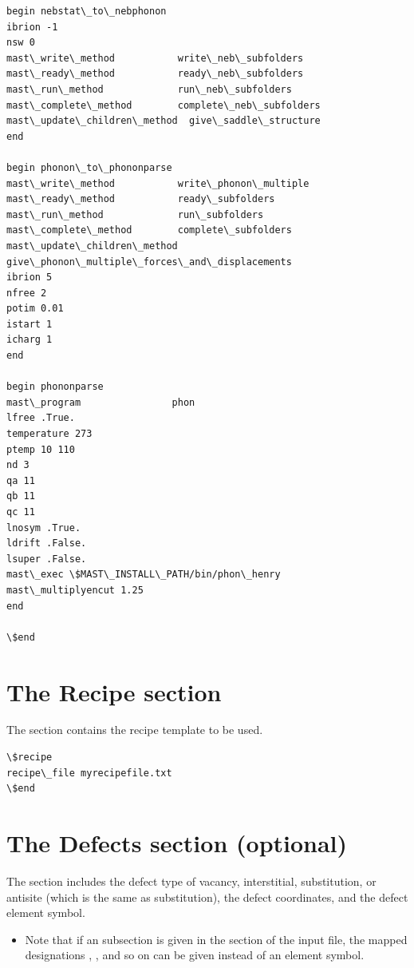 \documentclass[letterpaper,10pt,english]{sphinxmanual}
\begin{document}
\begin{Verbatim}[commandchars=\\\{\}]
begin nebstat\_to\_nebphonon
ibrion -1
nsw 0
mast\_write\_method           write\_neb\_subfolders
mast\_ready\_method           ready\_neb\_subfolders
mast\_run\_method             run\_neb\_subfolders
mast\_complete\_method        complete\_neb\_subfolders
mast\_update\_children\_method  give\_saddle\_structure
end

begin phonon\_to\_phononparse
mast\_write\_method           write\_phonon\_multiple
mast\_ready\_method           ready\_subfolders
mast\_run\_method             run\_subfolders
mast\_complete\_method        complete\_subfolders
mast\_update\_children\_method  give\_phonon\_multiple\_forces\_and\_displacements
ibrion 5
nfree 2
potim 0.01
istart 1
icharg 1
end

begin phononparse
mast\_program                phon
lfree .True.
temperature 273
ptemp 10 110
nd 3
qa 11
qb 11
qc 11
lnosym .True.
ldrift .False.
lsuper .False.
mast\_exec \$MAST\_INSTALL\_PATH/bin/phon\_henry
mast\_multiplyencut 1.25
end

\$end
\end{Verbatim}


\section{The Recipe section}
\label{3_0_inputfile:the-recipe-section}
The  section contains the recipe template to be used.

\begin{Verbatim}[commandchars=\\\{\}]
\$recipe
recipe\_file myrecipefile.txt
\$end
\end{Verbatim}


\section{The Defects section (optional)}
\label{3_0_inputfile:the-defects-section-optional}
The  section includes the defect type of vacancy, interstitial, substitution, or antisite (which is the same as substitution), the defect coordinates, and the defect element symbol.
\begin{itemize}
\item {} 
Note that if an  subsection is given in the  section of the input file, the mapped designations , , and so on can be given instead of an element symbol.

\end{itemize}
\end{document}
